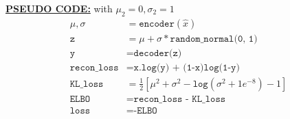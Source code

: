 \underline{\textbf{PSEUDO CODE:}} with $\mu_2=0, \sigma_2 = 1$
\begin{align}
	\mu, \sigma &= \texttt{encoder}(\hat{x})\\
	\texttt{z} &= \mu + \sigma * \texttt{random\_normal(0, 1)}\\
	\texttt{y} &= \texttt{decoder(z)}\\
	\texttt{recon\_loss} &= \texttt{x.log(y) + (1-x)log(1-y)}\\
	\texttt{KL\_loss} &= \frac{1}{2} [ \mu^2 + \sigma^2 - \texttt{log}(\sigma^2 + 1e^{-8}) -1 ]\\
	\texttt{ELBO} &= \texttt{recon\_loss - KL\_loss}\\
	\texttt{loss} &= \texttt{-ELBO}
\end{align}